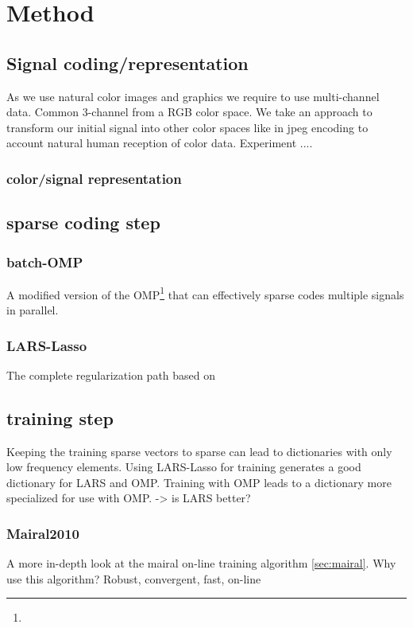 \chapter{Method}


\section{Signal coding/representation}
As we use natural color images and graphics we require to use multi-channel data. Common 3-channel from a RGB color space.
We take an approach to transform our initial signal into other color spaces like in jpeg encoding to account natural human reception of
color data. 
Experiment ....
\subsection{color/signal representation}

\section{sparse coding step}
\subsection{batch-OMP}
A modified version of the OMP\footnote{} that can effectively sparse codes multiple signals in parallel.
\cite{Rubinstein2008}

\subsection{LARS-Lasso}
The complete regularization path based on \cite{Efron2004}

\section{training step}
Keeping the training sparse vectors to sparse can lead to dictionaries with only low frequency elements.
Using LARS-Lasso for training generates a good dictionary for LARS and OMP. Training with OMP leads to 
a dictionary more specialized for use with OMP. -> is LARS better?

\subsection{Mairal2010}
A more in-depth look at the mairal on-line training algorithm \ref{sec:mairal}. 
Why use this algorithm? Robust, convergent, fast, on-line

